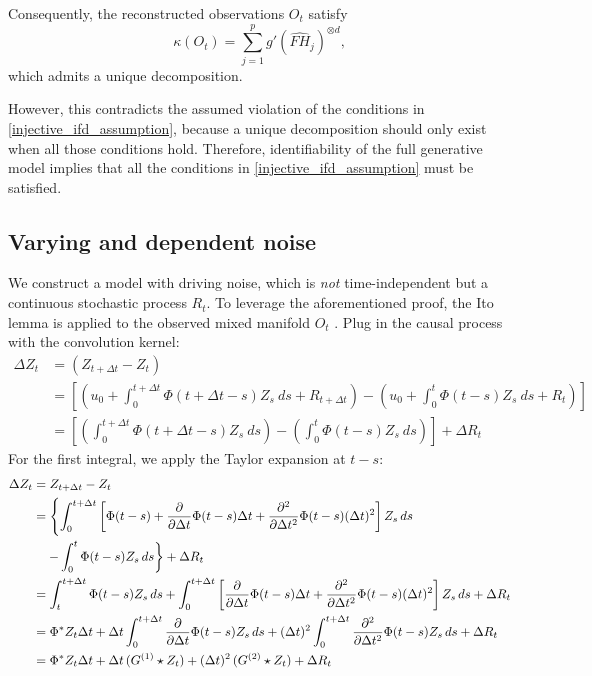 \documentclass[10pt]{article}
\numberwithin{figure}{section}
\begin{document}
Consequently, the reconstructed observations $O_t$ satisfy
\[
\kappa(O_t) = \sum\limits_{j=1}^{p} g'(\hat{FH}_j)^{\otimes d},
\]
which admits a unique decomposition.  

However, this contradicts the assumed violation of the conditions in \autoref{injective_ifd_assumption}, because a unique decomposition should only exist when all those conditions hold. Therefore, identifiability of the full generative model implies that all the conditions in \autoref{injective_ifd_assumption} must be satisfied.

\subsection{Varying and dependent noise}\label{dependent}
We construct a model with driving noise, which is \textit{not} time-independent but a continuous stochastic process $R_t$. To leverage the aforementioned proof, the Ito lemma is applied to the observed mixed manifold $O_t$ . Plug in the causal process with the convolution kernel:
\begin{align*}
    \Delta Z_t &= (Z_{t+\Delta t} - Z_{t})\\
    &=\left[(u_0+\int_{0}^{t+\Delta t}\Phi(t+\Delta t -s)Z_s\ ds + R_{t+\Delta t})-(u_0+\int_{0}^{t}\Phi(t -s)Z_s\ ds + R_{t})\right]\\
    &= \left[(\int_{0}^{t+\Delta t}\Phi(t+\Delta t -s)Z_s\ ds )-(\int_{0}^{t}\Phi(t -s)Z_s\ ds)\right]+\Delta R_t
\end{align*}
For the first integral, we apply the Taylor expansion at $t-s$:
\begin{align}
  \Delta Z_t &= Z_{t+\Delta t} - Z_{t}\notag\\
  &= \left\{ \int_{0}^{t+\Delta t} \left[ \Phi(t -s)
  + \frac{\partial}{\partial \Delta t}\Phi(t -s)\Delta t
  + \frac{\partial^2}{\partial \Delta t^2}\Phi(t -s)(\Delta t)^2 \right] Z_s\, ds \right. \\
  &\quad \left. - \int_{0}^{t}\Phi(t -s)Z_s\, ds \right\} + \Delta R_t \notag\\
  &= \int_{t}^{t+\Delta t} \Phi(t -s)Z_s\, ds 
  + \int_{0}^{t+\Delta t} \left[ \frac{\partial}{\partial \Delta t}\Phi(t -s)\Delta t
  + \frac{\partial^2}{\partial \Delta t^2}\Phi(t -s)(\Delta t)^2 \right] Z_s\, ds + \Delta R_t \notag\\
  &= \Phi^{*}Z_t\Delta t
  + \Delta t \int_{0}^{t+\Delta t} \frac{\partial}{\partial \Delta t}\Phi(t -s) Z_s\, ds
  + (\Delta t)^2 \int_{0}^{t+\Delta t} \frac{\partial^2}{\partial \Delta t^2}\Phi(t -s) Z_s\, ds
  + \Delta R_t \notag\\
  &= \Phi^{*}Z_t\Delta t
  + \Delta t\, (G^{(1)} \star Z_t)
  + (\Delta t)^2\, (G^{(2)} \star Z_t)
  + \Delta R_t
\end{align}
\end{document}
